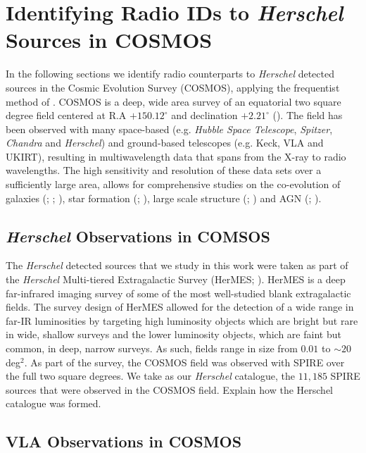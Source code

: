 \section{Identifying Radio IDs to \textit{Herschel} Sources in COSMOS}

In the following sections we identify radio counterparts to \textit{Herschel} detected sources in the Cosmic Evolution Survey (COSMOS), applying the frequentist method of \citealt{Lilly_1999}. COSMOS is a deep, wide area survey of an equatorial two square degree field centered at R.A $+150.12^{\circ}$ and declination $+2.21^{\circ}$ (\citealt{Scoville_2007}). The field has been observed with many space-based (e.g. \textit{Hubble Space Telescope}, \textit{Spitzer}, \textit{Chandra} and \textit{Herschel}) and ground-based telescopes (e.g. Keck, VLA and UKIRT), resulting in multiwavelength data that spans from the X-ray to radio wavelengths. The high sensitivity and resolution of these data sets over a sufficiently large area, allows for comprehensive studies on the co-evolution of galaxies (\citealt{Schreiber_2018}; \citealt{Stockmann_2020}; \citealt{Valentino_2020a}), star formation (\citealt{Gruppioni_2013}; \citealt{Novak_2017}), large scale structure (\citealt{Scoville_2013}; \citealt{Laigle_2018}) and AGN (\citealt{Prescott_2006}; \citealt{Heintz_2016}). 

\subsection{\textit{Herschel} Observations in COMSOS}

The \textit{Herschel} detected sources that we study in this work were taken as part of the \textit{Herschel} Multi-tiered Extragalactic Survey (HerMES; \citealt{Oliver_2012}). HerMES is a deep far-infrared imaging survey of some of the most well-studied blank extragalactic fields. The survey design of HerMES allowed for the detection of a wide range in far-IR luminosities by targeting high luminosity objects which are bright but rare in wide, shallow surveys and the lower luminosity objects, which are faint but common, in deep, narrow surveys. As such, fields range in size from $0.01$ to $\sim 20\,$deg$^2$. As part of the survey, the COSMOS field was observed with SPIRE over the full two square degrees. We take as our \textit{Herschel} catalogue, the $11,185$ SPIRE sources that were observed in the COSMOS field. {\color{red}Explain how the Herschel catalogue was formed.}

\subsection{VLA Observations in COSMOS}

